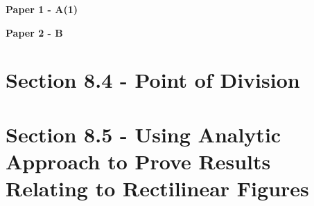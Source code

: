 \documentclass[12pt, a4paper]{article}
\begin{document}
\textbf{Paper 1 - A(1)}
\begin{enumx}[label=\arabic*.,start=1]
\item {}\label{DSE2012S-CoreP1-Q08} 
\item {}\label{DSE2014-CoreP1-Q08} 
\item {}\label{DSE2017-CoreP1-Q06} 
\end{enumx}
\textbf{Paper 2 - B}
\begin{enumx}[label=\arabic*.,start=4]
\item {}\label{DSE2012P-CoreP2-Q42} 
\item {}\label{DSE2013-CoreP2-Q43} 
\item {}\label{DSE2015-CoreP2-Q42} 
\end{enumx}




\section*{Section 8.4 - Point of Division}\label{section:3-8-4}





\section*{Section 8.5 - Using Analytic Approach to Prove Results Relating to Rectilinear Figures \NF}\label{section:3-8-5}
\end{document}
